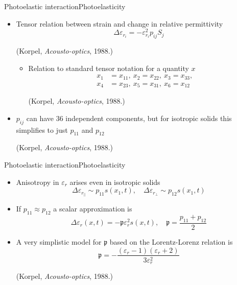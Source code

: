 \documentclass[11pt]{beamer}
\begin{document}
	\begin{frame}{Photoelastic interaction}{Photoelasticity}
		\pause
		\begin{itemize}
			\item Tensor relation between strain and change in relative permittivity
			\begin{equation*}
				\Delta \varepsilon_{r_i} = -\varepsilon_{r_i}^2 p_{ij} S_j
			\end{equation*}
			\parbox{\linewidth}{\tiny (Korpel, \emph{Acousto-optics}, 1988.)}
			\pause
			\begin{itemize}
				\item Relation to standard tensor notation for a quantity $x$
				\begin{align*}
					x_1 &= x_{11},\ x_2 = x_{22},\ x_3 = x_{33}, \\
					x_4 &= x_{23},\ x_5 = x_{31},\ x_6 = x_{12}
				\end{align*}
			\parbox{\linewidth}{\tiny (Korpel, \emph{Acousto-optics}, 1988.)}
			\end{itemize}
			\pause
			\item $p_{ij}$ can have 36 independent components, but for isotropic solids this simplifies to just $p_{11}$ and $p_{12}$
			\parbox{\linewidth}{\tiny (Korpel, \emph{Acousto-optics}, 1988.)}
		\end{itemize}
	\end{frame}
	
	\begin{frame}{Photoelastic interaction}{Photoelasticity}
		\begin{itemize}
			\item Anisotropy in $\varepsilon_r$ arises even in isotropic solids
			\begin{equation*}
				\Delta \varepsilon_{r_\parallel} \sim p_{11} s(x_1,t), \quad \Delta \varepsilon_{r_\perp} \sim p_{12} s(x_1,t)
			\end{equation*}
			\pause
			\item If  $p_{11} \approx p_{12}$ a scalar approximation is
			\begin{equation*}
				\Delta \varepsilon_r(x,t) = -\mathfrak{p} \varepsilon_r^2 s(x,t), \quad \mathfrak{p} = \frac{p_{11} + p_{12}}{2}
			\end{equation*}
			\pause
			\item A very simplistic model for $\mathfrak{p}$ based on the Lorentz-Lorenz relation is
			\begin{equation*}
				\mathfrak{p} = -\frac{(\varepsilon_r - 1)(\varepsilon_r + 2)}{3\varepsilon_r^2}
			\end{equation*}
			\parbox{\linewidth}{\tiny (Korpel, \emph{Acousto-optics}, 1988.)}
		\end{itemize}
	\end{frame}
		
\end{document}

